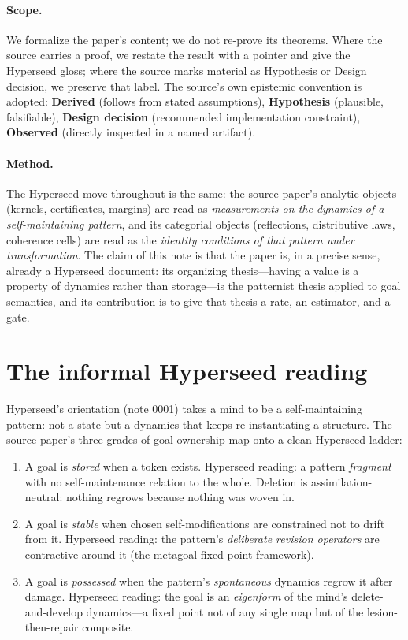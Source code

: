 \documentclass[11pt]{article}
\begin{document}
\paragraph{Scope.} We formalize the paper's content; we do not re-prove its theorems.
Where the source carries a proof, we restate the result with a pointer and give the
Hyperseed gloss; where the source marks material as Hypothesis or Design decision, we
preserve that label. The source's own epistemic convention is adopted: \textbf{Derived}
(follows from stated assumptions), \textbf{Hypothesis} (plausible, falsifiable),
\textbf{Design decision} (recommended implementation constraint), \textbf{Observed}
(directly inspected in a named artifact).

\paragraph{Method.} The Hyperseed move throughout is the same: the source paper's
analytic objects (kernels, certificates, margins) are read as \emph{measurements on the
dynamics of a self-maintaining pattern}, and its categorial objects (reflections,
distributive laws, coherence cells) are read as the \emph{identity conditions of that
pattern under transformation}. The claim of this note is that the paper is, in a precise
sense, already a Hyperseed document: its organizing thesis---having a value is a property
of dynamics rather than storage---is the patternist thesis applied to goal semantics, and
its contribution is to give that thesis a rate, an estimator, and a gate.

\section{The informal Hyperseed reading}

Hyperseed's orientation (note 0001) takes a mind to be a self-maintaining pattern:
not a state but a dynamics that keeps re-instantiating a structure. The source paper's
three grades of goal ownership map onto a clean Hyperseed ladder:

\begin{enumerate}[label=(\roman*)]
\item A goal is \emph{stored} when a token exists. Hyperseed reading: a pattern
\emph{fragment} with no self-maintenance relation to the whole. Deletion is
assimilation-neutral: nothing regrows because nothing was woven in.
\item A goal is \emph{stable} when chosen self-modifications are constrained not to drift
from it. Hyperseed reading: the pattern's \emph{deliberate revision operators} are
contractive around it (the metagoal fixed-point framework).
\item A goal is \emph{possessed} when the pattern's \emph{spontaneous} dynamics regrow it
after damage. Hyperseed reading: the goal is an \emph{eigenform} of the mind's
delete-and-develop dynamics---a fixed point not of any single map but of the
lesion-then-repair composite.
\end{enumerate}
\end{document}
